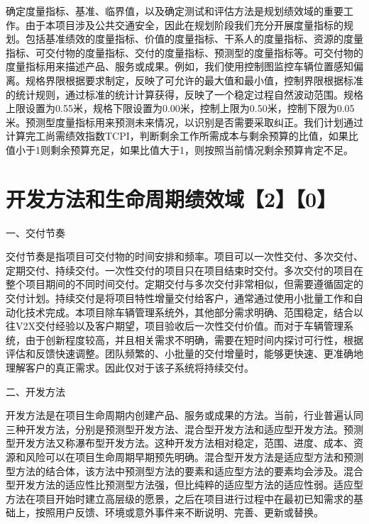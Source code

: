 \documentclass[UTF8]{../computerUniverse}
\begin{document}
确定度量指标、基准、临界值，以及确定测试和评估方法是规划绩效域的重要工作。由于本项目涉及公共交通安全，因此在规划阶段我们充分开展度量指标的规划。包括基准绩效的度量指标、价值的度量指标、干系人的度量指标、资源的度量指标、可交付物的度量指标、交付的度量指标、预测型的度量指标等。可交付物的度量指标用来描述产品、服务或成果。例如，我们使用控制图监控车辆位置感知偏离。规格界限根据要求制定，反映了可允许的最大值和最小值，控制界限根据标准的统计规则，通过标准的统计计算获得，反映了一个稳定过程自然波动范围。规格上限设置为0.55米，规格下限设置为0.00米，控制上限为0.50米，控制下限为0.05米。预测型度量指标用来预测未来情况，以识别是否需要采取纠正。我们计划通过计算完工尚需绩效指数TCPI，判断剩余工作所需成本与剩余预算的比值，如果比值小于1则剩余预算充足，如果比值大于1，则按照当前情况剩余预算肯定不足。




\chapter{开发方法和生命周期绩效域【2】【0】}



一、交付节奏

交付节奏是指项目可交付物的时间安排和频率。项目可以一次性交付、多次交付、定期交付、持续交付。一次性交付的项目只在项目结束时交付。多次交付的项目在整个项目期间的不同时间交付。定期交付与多次交付非常相似，但需要遵循固定的交付计划。持续交付是将项目特性增量交付给客户，通常通过使用小批量工作和自动化技术完成。本项目除车辆管理系统外，其他部分需求明确、范围稳定，结合以往V2X交付经验以及客户期望，项目验收后一次性交付价值。而对于车辆管理系统，由于创新程度较高，并且相关需求不明确，需要在短时间内探讨可行性，根据评估和反馈快速调整。团队频繁的、小批量的交付增量时，能够更快速、更准确地理解客户的真正需求。因此仅对于该子系统将持续交付。



二、开发方法

开发方法是在项目生命周期内创建产品、服务或成果的方法。当前，行业普遍认同三种开发方法，分别是预测型开发方法、混合型开发方法和适应型开发方法。预测型开发方法又称瀑布型开发方法。这种开发方法相对稳定，范围、进度、成本、资源和风险可以在项目生命周期早期预先明确。混合型开发方法是适应型方法和预测型方法的结合体，该方法中预测型方法的要素和适应型方法的要素均会涉及。混合型开发方法的适应性比预测型方法强，但比纯粹的适应型方法的适应性弱。适应型方法在项目开始时建立高层级的愿景，之后在项目进行过程中在最初已知需求的基础上，按照用户反馈、环境或意外事件来不断说明、完善、更新或替换。
\end{document}

